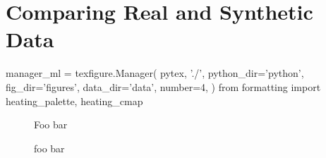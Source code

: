 \section{Comparing Real and Synthetic Data}\label{compare}

\begin{pycode}[manager_ml]
manager_ml = texfigure.Manager(
    pytex, './',
    python_dir='python',
    fig_dir='figures',
    data_dir='data',
    number=4,
)
from formatting import heating_palette, heating_cmap
\end{pycode}


\begin{figure*}
    \caption{Foo bar}
    \label{fig:probability_maps}
\end{figure*}


\begin{figure}
    \caption{foo bar}
    \label{fig:frequency_map}
\end{figure}
